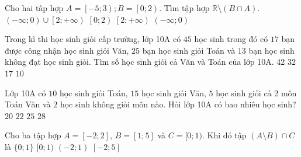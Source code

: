 \begin{ex}%
	Cho hai tâp hợp $A = \left[-5; 3\right); B = \left[0; 2\right)$. Tìm tập hợp $\mathbb{R} \setminus \left( B \cap A\right)$.
	\choice
	{\True $\left(-\infty; 0\right) \cup \left[2; +\infty\right)$}
	{$\left[0; 2\right)$}
	{$\left[2; +\infty\right)$}
	{$\left(-\infty; 0\right)$}
\loigiai{Do $A \cap B = \left[0; 2\right)$ nên $\mathbb{R} \setminus (A \cap B) = (-\infty; 0) \cup [2; +\infty)$}
\end{ex}
\begin{ex}%
	Trong kì thi học sinh giỏi cấp trường, lớp 10A có $45$ học sinh trong đó có  $17$ bạn được công nhận học sinh giỏi Văn, $25$ bạn học sinh giỏi Toán và $13$ bạn học sinh không đạt học sinh giỏi. Tìm số học sinh giỏi cả Văn và Toán của lớp 10A.
	\choice
	{$42$ }
	{$32$}
	{$17$}
	{\True $10$}
\end{ex}
\begin{ex}%
	Lớp 10A có $10$ học sinh giỏi Toán, $15$ học sinh giỏi Văn, $5$ học sinh giỏi cả 2 môn Toán Văn và $2$ học sinh không giỏi môn nào. Hỏi lớp 10A có bao nhiêu học sinh?
	\choice
	{$20$ }
	{\True $22$}
	{$25$}
	{$28$}
\end{ex}
\begin{ex}%
	Cho ba tập hợp $A=[-2 ; 2]$, $B=[1 ; 5]$ và $C=[0 ; 1)$. Khi đó tập $(A \setminus B) \cap C$ là
	\choice
	{$\{0 ; 1\}$}
	{\True $[0 ; 1)$}
	{$(-2 ; 1)$}
	{$[-2 ; 5]$}
\loigiai{
	Ta có $A \setminus B = [-2;1)$, suy ra $(A \setminus B) \cap C = [0 ; 1)$.
	}
\end{ex}
